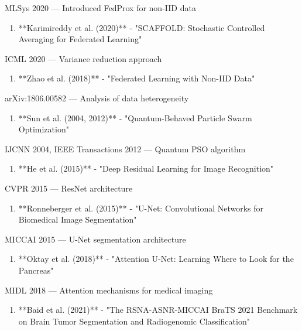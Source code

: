 MLSys 2020 — Introduced FedProx for non-IID data

\begin{enumerate}
  \item **Karimireddy et al. (2020)** - "SCAFFOLD: Stochastic Controlled Averaging for Federated Learning"
\end{enumerate}

ICML 2020 — Variance reduction approach

\begin{enumerate}
  \item **Zhao et al. (2018)** - "Federated Learning with Non-IID Data"
\end{enumerate}

arXiv:1806.00582 — Analysis of data heterogeneity

\begin{enumerate}
  \item **Sun et al. (2004, 2012)** - "Quantum-Behaved Particle Swarm Optimization"
\end{enumerate}

IJCNN 2004, IEEE Transactions 2012 — Quantum PSO algorithm

\begin{enumerate}
  \item **He et al. (2015)** - "Deep Residual Learning for Image Recognition"
\end{enumerate}

CVPR 2015 — ResNet architecture

\begin{enumerate}
  \item **Ronneberger et al. (2015)** - "U-Net: Convolutional Networks for Biomedical Image Segmentation"
\end{enumerate}

MICCAI 2015 — U-Net segmentation architecture

\begin{enumerate}
  \item **Oktay et al. (2018)** - "Attention U-Net: Learning Where to Look for the Pancreas"
\end{enumerate}

MIDL 2018 — Attention mechanisms for medical imaging

\begin{enumerate}
  \item **Baid et al. (2021)** - "The RSNA-ASNR-MICCAI BraTS 2021 Benchmark on Brain Tumor Segmentation and Radiogenomic Classification"
\end{enumerate}

